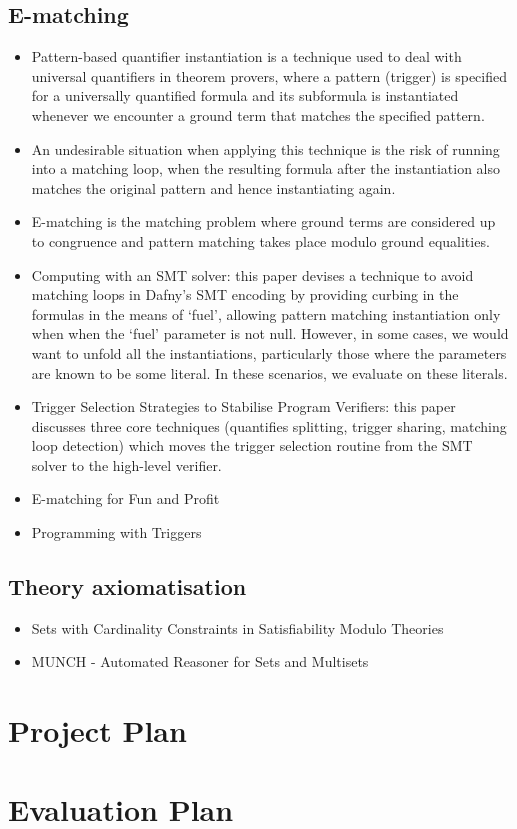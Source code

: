 \documentclass[12pt]{article}
\begin{document}
\subsection{E-matching}
\begin{itemize}
    \item Pattern-based quantifier instantiation is a technique used to deal with universal quantifiers in theorem provers, where a pattern (trigger) is specified for a universally quantified formula and its subformula is instantiated whenever we encounter a ground term that matches the specified pattern.
    \item An undesirable situation when applying this technique is the risk of running into a matching loop, when the resulting formula after the instantiation also matches the original pattern and hence instantiating again.
    \item E-matching is the matching problem where ground terms are considered up to congruence and pattern matching takes place modulo ground equalities.
    \item Computing with an SMT solver: this paper devises a technique to avoid matching loops in Dafny's SMT encoding by providing curbing in the formulas in the means of `fuel', allowing pattern matching instantiation only when when the `fuel' parameter is not null. However, in some cases, we would want to unfold all the instantiations, particularly those where the parameters are known to be some literal. In these scenarios, we evaluate on these literals.
    \item Trigger Selection Strategies to Stabilise Program Verifiers: this paper discusses three core techniques (quantifies splitting, trigger sharing, matching loop detection) which moves the trigger selection routine from the SMT solver to the high-level verifier.
    \item E-matching for Fun and Profit
    \item Programming with Triggers
\end{itemize}

\subsection{Theory axiomatisation}
\begin{itemize}
    \item Sets with Cardinality Constraints in Satisfiability Modulo Theories
    \item MUNCH - Automated Reasoner for Sets and Multisets
\end{itemize}


\section{Project Plan}


\section{Evaluation Plan}
\end{document}
